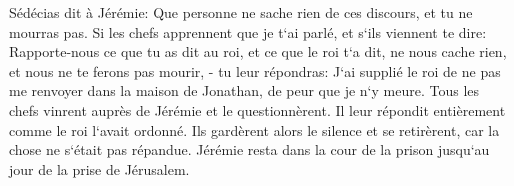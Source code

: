 \verse Sédécias dit à Jérémie: Que personne ne sache rien de ces discours, et tu ne mourras pas. 
\verse Si les chefs apprennent que je t`ai parlé, et s`ils viennent te dire: Rapporte-nous ce que tu as dit au roi, et ce que le roi t`a dit, ne nous cache rien, et nous ne te ferons pas mourir, - 
\verse tu leur répondras: J`ai supplié le roi de ne pas me renvoyer dans la maison de Jonathan, de peur que je n`y meure. 
\verse Tous les chefs vinrent auprès de Jérémie et le questionnèrent. Il leur répondit entièrement comme le roi l`avait ordonné. Ils gardèrent alors le silence et se retirèrent, car la chose ne s`était pas répandue. 
\verse Jérémie resta dans la cour de la prison jusqu`au jour de la prise de Jérusalem. 

